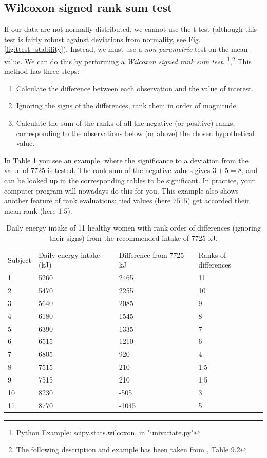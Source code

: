 \subsection{Wilcoxon signed rank sum test}

If our data are not normally distributed, we cannot use the t-test (although this test is fairly robust against deviations from normality, see Fig. \ref{fig:ttest_stability}). Instead, we must use a \emph{non-parametric} test on the mean value. We can do this by performing a \emph{Wilcoxon signed rank sum test}.
 \footnote{Python Example: scipy.stats.wilcoxon, in "univariate.py"},\footnote{The following description and example has been taken from \cite{altman99}, Table 9.2}
This method has three steps:

\begin{enumerate}
  \item Calculate the difference between each observation and the value of interest.
  \item Ignoring the signs of the differences, rank them in order of magnitude.
  \item Calculate the sum of the ranks of all the negative (or positive) ranks, corresponding to the observations below (or above) the chosen hypothetical value.
\end{enumerate}

In Table \ref{tab:wilcoxon} you see an example, where the significance to a deviation from the value of 7725 is tested. The rank sum of the negative values gives $3+5=8$, and can be looked up in the corresponding tables to be significant. In practice, your computer program will nowadays do this for you. This example also shows another feature of rank evaluations: tied values (here $7515$) get accorded their mean rank (here $1.5$).

\begin{table}
  \centering
  \begin{tabular}{l p{2cm} p{2cm} p{2cm}}
     \hline
     Subject & Daily energy intake (kJ) & Difference from 7725 kJ & Ranks of differences \\
     1 & 5260 & 2465 & 11 \\
     2 & 5470 & 2255 & 10 \\
     3 & 5640 & 2085 & 9 \\
     4 & 6180 & 1545 & 8 \\
     5 & 6390 & 1335 & 7 \\
     6 & 6515 & 1210 & 6 \\
     7 & 6805 & 920 & 4 \\
     8 & 7515 & 210 & 1.5 \\
     9 & 7515 & 210 & 1.5 \\
     10 & 8230 & -505 & 3 \\
     11 & 8770 & -1045 & 5 \\
     \hline
   \end{tabular}
  \caption{Daily energy intake of 11 healthy women with rank order of differences (ignoring their signs) from the recommended intake of 7725 kJ.}\label{tab:wilcoxon}
\end{table}


